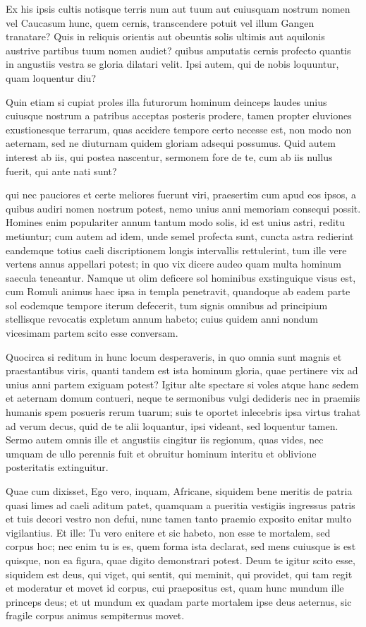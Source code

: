  Ex his ipsis cultis notisque terris num aut tuum aut cuiusquam nostrum nomen vel Caucasum hunc, quem cernis, transcendere potuit vel illum Gangen tranatare? Quis in reliquis orientis aut obeuntis solis ultimis aut aquilonis austrive partibus tuum nomen audiet? quibus amputatis cernis profecto quantis in angustiis vestra se gloria dilatari velit. Ipsi autem, qui de nobis loquuntur, quam loquentur diu?

 Quin etiam si cupiat proles illa futurorum hominum deinceps laudes unius cuiusque nostrum a patribus acceptas posteris prodere, tamen propter eluviones exustionesque terrarum, quas accidere tempore certo necesse est, non modo non aeternam, sed ne diuturnam quidem gloriam adsequi possumus. Quid autem interest ab iis, qui postea nascentur, sermonem fore de te, cum ab iis nullus fuerit, qui ante nati sunt?

 qui nec pauciores et certe meliores fuerunt viri, praesertim cum apud eos ipsos, a quibus audiri nomen nostrum potest, nemo unius anni memoriam consequi possit. Homines enim populariter annum tantum modo solis, id est unius astri, reditu metiuntur; cum autem ad idem, unde semel profecta sunt, cuncta astra redierint eandemque totius caeli discriptionem longis intervallis rettulerint, tum ille vere vertens annus appellari potest; in quo vix dicere audeo quam multa hominum saecula teneantur. Namque ut olim deficere sol hominibus exstinguique visus est, cum Romuli animus haec ipsa in templa penetravit, quandoque ab eadem parte sol eodemque tempore iterum defecerit, tum signis omnibus ad principium stellisque revocatis expletum annum habeto; cuius quidem anni nondum vicesimam partem scito esse conversam.

 Quocirca si reditum in hunc locum desperaveris, in quo omnia sunt magnis et praestantibus viris, quanti tandem est ista hominum gloria, quae pertinere vix ad unius anni partem exiguam potest? Igitur alte spectare si voles atque hanc sedem et aeternam domum contueri, neque te sermonibus vulgi dedideris nec in praemiis humanis spem posueris rerum tuarum; suis te oportet inlecebris ipsa virtus trahat ad verum decus, quid de te alii loquantur, ipsi videant, sed loquentur tamen. Sermo autem omnis ille et angustiis cingitur iis regionum, quas vides, nec umquam de ullo perennis fuit et obruitur hominum interitu et oblivione posteritatis extinguitur.

 Quae cum dixisset, Ego vero, inquam, Africane, siquidem bene meritis de patria quasi limes ad caeli aditum patet, quamquam a pueritia vestigiis ingressus patris et tuis decori vestro non defui, nunc tamen tanto praemio exposito enitar multo vigilantius. Et ille: Tu vero enitere et sic habeto, non esse te mortalem, sed corpus hoc; nec enim tu is es, quem forma ista declarat, sed mens cuiusque is est quisque, non ea figura, quae digito demonstrari potest. Deum te igitur scito esse, siquidem est deus, qui viget, qui sentit, qui meminit, qui providet, qui tam regit et moderatur et movet id corpus, cui praepositus est, quam hunc mundum ille princeps deus; et ut mundum ex quadam parte mortalem ipse deus aeternus, sic fragile corpus animus sempiternus movet.

